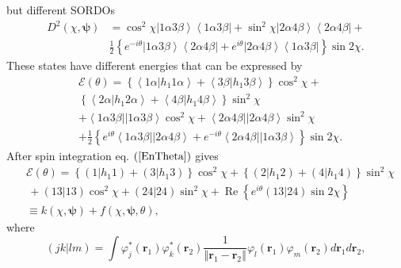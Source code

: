 \documentclass[aps,preprint]{revtex4}%
\begin{document}
but different SORDOs%
\begin{align*}
D^{2}\left(  \chi,\boldsymbol{\psi}\right)   &  =\cos^{2}\chi\left\vert
1\alpha3\beta\right\rangle \left\langle 1\alpha3\beta\right\vert +\sin^{2}%
\chi\left\vert 2\alpha4\beta\right\rangle \left\langle 2\alpha4\beta
\right\vert +\\
&  \frac{1}{2}\left\{  e^{-i\theta}\left\vert 1\alpha3\beta\right\rangle
\left\langle 2\alpha4\beta\right\vert +e^{i\theta}\left\vert 2\alpha
4\beta\right\rangle \left\langle 1\alpha3\beta\right\vert \right\}  \sin2\chi.
\end{align*}
These states have different energies that can be expressed by%
\begin{align*}
&  \mathcal{E}\left(  \theta\right)  =\left\{  \left\langle 1\alpha\left\vert
h_{1}1\alpha\right.  \right\rangle +\left\langle 3\beta\left\vert h_{1}%
3\beta\right.  \right\rangle \right\}  \cos^{2}\chi+\\
&  \left\{  \left\langle 2\alpha\left\vert h_{1}2\alpha\right.  \right\rangle
+\left\langle 4\beta\left\vert h_{1}4\beta\right.  \right\rangle \right\}
\sin^{2}\chi\\
&  +\left\langle 1\alpha3\beta\right\vert \left\vert 1\alpha3\beta
\right\rangle \cos^{2}\chi+\left\langle 2\alpha4\beta\right\vert \left\vert
2\alpha4\beta\right\rangle \sin^{2}\chi\\
&  +\frac{1}{2}\left\{  e^{i\theta}\left\langle 1\alpha3\beta\right\vert
\left\vert 2\alpha4\beta\right\rangle +e^{-i\theta}\left\langle 2\alpha
4\beta\right\vert \left\vert 1\alpha3\beta\right\rangle \right\}  \sin2\chi.
\end{align*}
After spin integration eq. $\left(  \ref{EnTheta}\right)  $ gives
\begin{align*}
&  \mathcal{E}\left(  \theta\right)  =\left\{  \left(  1\left\vert
h_{1}1\right.  \right)  +\left(  3\left\vert h_{1}3\right.  \right)  \right\}
\cos^{2}\chi+\left\{  \left(  2\left\vert h_{1}2\right.  \right)  +\left(
4\left\vert h_{1}4\right.  \right)  \right\}  \sin^{2}\chi\\
&  \,+\left(  \left.  13\right\vert 13\right)  \cos^{2}\chi+\left(  \left.
24\right\vert 24\right)  \sin^{2}\chi+\operatorname{Re}\left\{  e^{i\theta
}\left(  \left.  13\right\vert 24\right)  \sin2\chi\right\}  \\
&  \equiv k\left(  \chi,\boldsymbol{\psi}\right)  +f\left(  \chi
,\boldsymbol{\psi},\theta\right)  ,
\end{align*}
where
\[
\left(  \left.  jk\right\vert lm\right)  =\int\varphi_{j}^{\ast}\left(
\boldsymbol{r}_{1}\right)  \varphi_{k}^{\ast}\left(  \boldsymbol{r}%
_{2}\right)  \frac{1}{\left\Vert \boldsymbol{r}_{1}-\boldsymbol{r}%
_{2}\right\Vert }\varphi_{l}\left(  \boldsymbol{r}_{1}\right)  \varphi
_{m}\left(  \boldsymbol{r}_{2}\right)  d\boldsymbol{r}_{1}d\boldsymbol{r}_{2},
\]%
\end{document}
